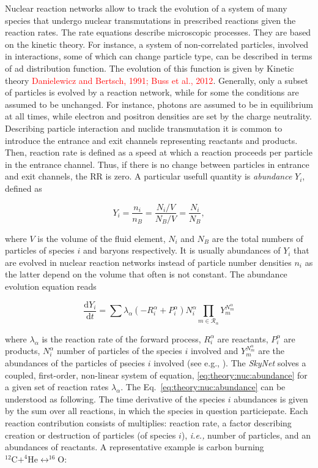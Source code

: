 \documentclass[11pt,a4paper,headinclude=true,DIV=14,BCOR=8mm,chapterprefix,listof=totoc,twoside,openright,abstracton]{scrbook}
\newcommand{\red}[1]{\textcolor{red}{#1}}
\begin{document}
Nuclear reaction networks allow to track the evolution of a system of many species that undergo nuclear transmutations in prescribed reactions given the reaction rates. The rate equations describe microscopic processes. They are based on the kinetic theory. For instance, a system of non-correlated particles, involved in interactions, some of which can change particle type, can be described in terms of  ad distribution function. The evolution of this function is given by Kinetic theory \red{Danielewicz and Bertsch, 1991; Buss et al., 2012}. 
Generally, only a subset of particles is evolved by a reaction network, while for some the conditions are assumed to be unchanged. For instance, photons are assumed to be in equilibrium at all times, while electron and positron densities are set by the charge neutrality. 
Describing particle interaction and nuclide transmutation it is common to introduce the entrance and exit channels representing reactants and products. Then, reaction rate is defined as a speed at which a reaction proceeds per particle in the entrance channel. Thus, if there is no change between particles in entrance and exit channels, the RR is zero. A particular usefull quantity is \textit{abundance} $Y_i$, defined as 

\begin{equation}
    \label{eq:theory:nuc:abundance}
    Y_i = \frac{n_i}{n_B} = \frac{N_i/V}{N_B/V} = \frac{N_i}{N_B},
\end{equation}

where $V$ is the volume of the fluid element, $N_i$ and $N_B$ are the total numbers of particles of species $i$ and baryons respectively. It is usually abundances of $Y_i$ that are evolved in nuclear reaction networks instead of particle number densities $n_i$ as the latter depend on the volume that often is not constant. 
The abundance evolution equation reads

\begin{equation}
    \frac{\text{d}Y_i}{\text{d}t} = \sum\lambda_{\alpha}(-R_{i}^{\alpha}+P_{i}^{\alpha})N_{i}^{\alpha}\prod_{m\in\mathcal{R}_{\alpha}}Y_m^{N_{m}^{\alpha}}
\end{equation}

where $\lambda_{\alpha}$ is the reaction rate of the forward process, $R_{i}^{\alpha}$ are reactants, $P_{i}^{\alpha}$ are products, $N_{i}^{\alpha}$ number of particles of the species $i$ involved and $Y_m^{N_{m}^{\alpha}}$ are the abundances of the particles of psecies $i$ involved (see e.g., \cite{Hix:1999}).
The \textit{SkyNet} solves a coupled, first-order, non-linear system of equation, \eqref{eq:theory:nuc:abundance} for a given set of reaction rates $\lambda_{\alpha}$.
The Eq.~\eqref{eq:theory:nuc:abundance} can be understood as following. The time derivative of the species $i$ abundances is given by the sum over all reactions, in which the species in question particiepate. Each reaction contribution consists of multiplies: reaction rate, a factor describing creation or destruction of particles (of species $i$), \textit{i.e.,} number of particles, and an abundances of reactants. 
A representative example is carbon burning $^{12}\text{C} + ^{4}\text{He} \leftrightarrow ^{16}\text{O}$:
\end{document}
